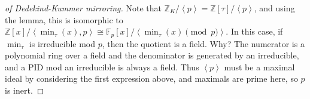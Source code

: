 \begin{proof}[of Dedekind-Kummer mirroring]

Note that
\({\mathbb{Z}}_K / \left\langle{ p }\right\rangle = {\mathbb{Z}}[ \tau] / \left\langle{ p }\right\rangle\),
and using the lemma, this is isomorphic to
\({\mathbb{Z}}[x] / \left\langle{ \min_{ \tau} (x), p }\right\rangle \cong {\mathbb{F}}_p[x] / \left\langle{ \min_\tau(x) \pmod p }\right\rangle\).
In this case, if \(\min_\tau\) is irreducible mod \(p\), then the
quotient is a field. Why? The numerator is a polynomial ring over a
field and the denominator is generated by an irreducible, and a PID mod
an irreducible is always a field. Thus
\(\left\langle{ p }\right\rangle\) must be a maximal ideal by
considering the first expression above, and maximals are prime here, so
\(p\) is inert.


\end{proof}
